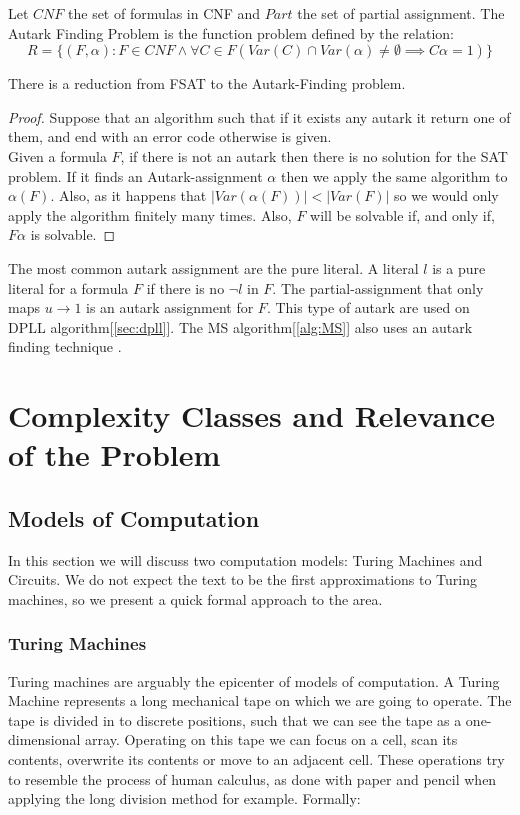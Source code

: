 \begin{definition}
  Let $CNF$ the set of formulas in CNF and $Part$ the set of partial assignment. The Autark Finding Problem is the function problem defined by the relation:
  $$R = \{(F,\alpha): F \in CNF\wedge \forall C \in F( Var(C)\cap Var(\alpha)\ne\emptyset \implies C\alpha=1 )\}$$
\end{definition}

\begin{proposition}
  There is a reduction from FSAT to the Autark-Finding problem.
\end{proposition}
\begin{proof} Suppose that an algorithm such that if it exists any autark it return one of them, and end with an error code otherwise is given.  \\

    Given a formula $F$, if there is not an autark then there is no solution for the SAT problem. If it finds an Autark-assignment $\alpha$ then we apply the same algorithm to $\alpha(F)$. Also, as it happens that $|Var(\alpha(F))|<|Var(F)|$ so we would only apply the algorithm finitely many times. Also, $F$ will be solvable if, and only if, $F\alpha$ is solvable.
\end{proof}


The most common autark assignment are the pure literal. A literal $l$ is a pure literal for a formula $F$ if there is no $\neg l$ in $F$. The partial-assignment that only maps $u\to 1$ is an autark assignment for $F$. This type of autark are used on DPLL algorithm[\ref{sec:dpll}]. The MS algorithm[\ref{alg:MS}] also uses an autark finding technique
. 

\chapter{Complexity Classes and Relevance of the Problem}
\section{Models of Computation}
In this section we will discuss two computation models: Turing Machines and Circuits. We do not expect the text to be the first approximations to Turing machines, so we present a quick formal approach to the area. 

\subsection{Turing Machines}
Turing machines are arguably the epicenter of  models of computation. A Turing Machine  represents a long mechanical tape on which we are going to operate. The tape is divided in to discrete positions, such that we can see the tape as a one-dimensional array. Operating on this tape we can focus on a cell, scan its contents, overwrite  its contents or move to an adjacent cell. These operations try to resemble the process of human calculus, as done with paper and pencil when applying the long division method  for example. Formally:

